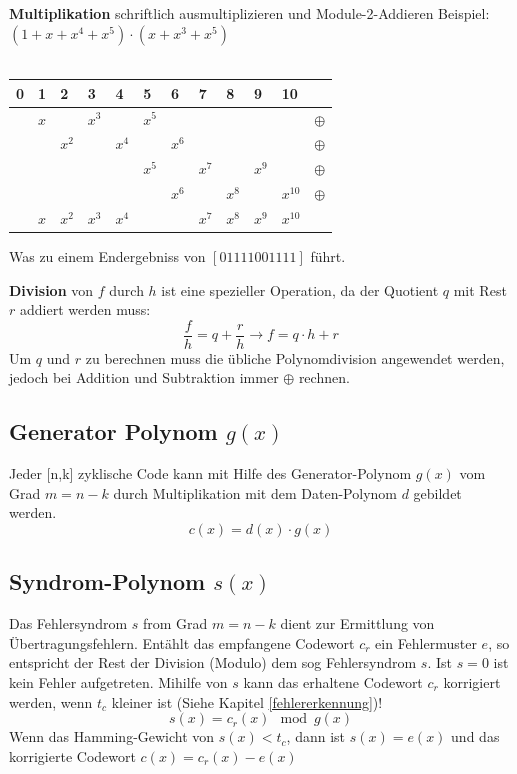 \textbf{Multiplikation}  schriftlich ausmultiplizieren und Module-2-Addieren 
Beispiel: $(1 + x + x^4 +x^5)\cdot(x+x^3+x^5)$~\\~\\
\begin{tabular}{lllllllllll|l}
	0 & 1 & 2 & 3 & 4 & 5 & 6 & 7 & 8 & 9 & 10 &\\ \toprule
& $x$ & & $x^3$ & & $x^5$ &&&& & & $\oplus$ \\
&& $x^2$ && $x^4$ && $x^6$ &&&& & $\oplus$\\
&&&&& $x^5$ && $x^7$ && $x^9$ & & $\oplus$\\
&&&&&& $x^6$ && $x^8$ && $x^{10}$ & $\oplus$\\ \midrule
& $x$ & $x^2$ & $x^3$ & $x^4$ &&& $x^7$ & $x^8$ & $x^9$ & $x^{10}$
\end{tabular}
Was zu einem Endergebniss von $[01111001111]$ führt.

\textbf{Division}  von $f$ durch $h$ ist eine spezieller Operation, da der Quotient $q$ mit Rest $r$ addiert werden muss:
\[
\frac{f}{h} = q + \frac{r}{h} \xrightarrow{} f = q\cdot h + r
\]
Um $q$ und $r$ zu berechnen muss die übliche Polynomdivision angewendet werden, jedoch bei Addition und Subtraktion immer $\oplus$ rechnen.


\subsection{Generator Polynom $g(x)$}
Jeder [n,k] zyklische Code kann mit Hilfe des Generator-Polynom $g(x)$ vom Grad $m =n-k$ durch Multiplikation mit dem Daten-Polynom $d$ gebildet werden.
\[
c(x) = d(x) \cdot g(x)
\]

\subsection{Syndrom-Polynom $s(x)$}
Das Fehlersyndrom $s$ from Grad $m=n-k$ dient zur Ermittlung von Übertragungsfehlern. Entählt das empfangene Codewort $c_r$ ein Fehlermuster $e$, so entspricht der Rest der Division (Modulo) dem sog Fehlersyndrom $s$. Ist $s=0$ ist kein Fehler aufgetreten. Mihilfe von $s$ kann das erhaltene Codewort $c_r$ korrigiert werden, wenn $t_c$ kleiner ist (Siehe Kapitel \ref{fehlererkennung})!
\[
s(x) = c_r(x) \mod g(x)
\]
Wenn das Hamming-Gewicht von $s(x) < t_c$, dann ist $s(x) = e(x)$ und das korrigierte Codewort $c(x) = c_r(x) - e(x)$ 



